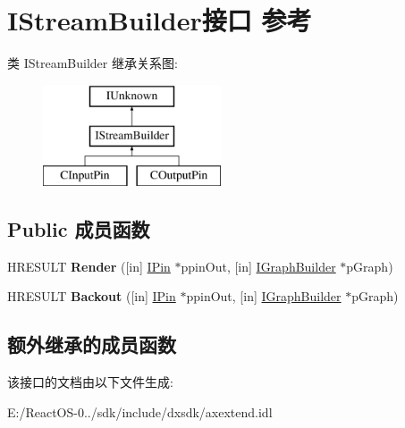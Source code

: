 \hypertarget{interface_i_stream_builder}{}\section{I\+Stream\+Builder接口 参考}
\label{interface_i_stream_builder}
类 I\+Stream\+Builder 继承关系图\+:\begin{figure}[H]
\begin{center}
\leavevmode
\includegraphics[height=3.000000cm]{interface_i_stream_builder}
\end{center}
\end{figure}
\subsection*{Public 成员函数}
\begin{DoxyCompactItemize}
\item 
\mbox{\label{interface_i_stream_builder_a1d5e50f088b7d6a074cf89e53cf105e9}} 
H\+R\+E\+S\+U\+LT {\bfseries Render} (\mbox{[}in\mbox{]} \hyperlink{interface_i_pin}{I\+Pin} $\ast$ppin\+Out, \mbox{[}in\mbox{]} \hyperlink{interface_i_graph_builder}{I\+Graph\+Builder} $\ast$p\+Graph)
\item 
\mbox{\label{interface_i_stream_builder_aac7667ae7c9107e1030856421597ea60}} 
H\+R\+E\+S\+U\+LT {\bfseries Backout} (\mbox{[}in\mbox{]} \hyperlink{interface_i_pin}{I\+Pin} $\ast$ppin\+Out, \mbox{[}in\mbox{]} \hyperlink{interface_i_graph_builder}{I\+Graph\+Builder} $\ast$p\+Graph)
\end{DoxyCompactItemize}
\subsection*{额外继承的成员函数}


该接口的文档由以下文件生成\+:\begin{DoxyCompactItemize}
\item 
E\+:/\+React\+O\+S-\/0../sdk/include/dxsdk/axextend.\+idl\end{DoxyCompactItemize}
